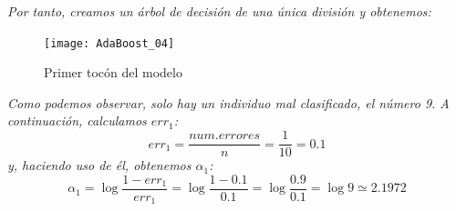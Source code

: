 \documentclass[12pt,twoside]{article}
\begin{document}
\textit{Por tanto, creamos un árbol de decisión de una única división y obtenemos:}

\begin{figure}[h]
\centering
\texttt{[image: AdaBoost\_04]}
\caption{Primer tocón del modelo}
\end{figure}

\textit{Como podemos observar, solo hay un individuo mal clasificado, el número 9. A continuación, calculamos $err_1$:}
\begin{equation*}
err_1 = \frac{num.errores}{n} = \frac{1}{10} = 0.1
\end{equation*}
\noindent
\textit{y, haciendo uso de él, obtenemos $\alpha_1$:}
\begin{equation*}
\alpha_1 = \log{\frac{1 - err_1}{err_1}} = \log{\frac{1- 0.1}{0.1}} = \log{\frac{0.9}{0.1}} = \log{9} \simeq 2.1972
\end{equation*}
\end{document}
